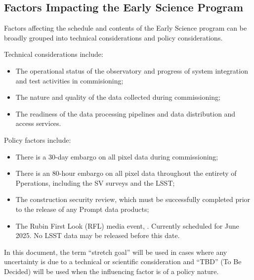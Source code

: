 \subsection{Factors Impacting the Early Science Program }
\label{ssec:impact}

Factors affecting the schedule and contents of the Early Science program can be broadly grouped into technical considerations and policy considerations. 

Technical considerations include:
\begin{itemize}
\item The operational status of the observatory and progress of system integration and test activities in commisioning; 
\item The nature and quality of the data collected during commissioning; 
\item The readiness of the data processing pipelines and data distribution and access services. 
\end{itemize}
Policy factors include:
\begin{itemize}
\item There is a 30-day embargo on all pixel data during commissioning;
\item There is an 80-hour embargo on all pixel data throughout the entirety of Pperations, including the SV surveys and the LSST; 
\item The construction security review, which must be successfully completed prior to the release of any Prompt data products; 
\item The Rubin First Look (RFL) media event, . Currently scheduled for  June 2025. No LSST data may be released before this date. 
\end{itemize}
 
In this document, the term ``stretch goal'' will be used in cases where any uncertainty is due to a technical or scientific consideration and ``TBD'' (To Be Decided) will be used when the influencing factor is of a policy nature. 

